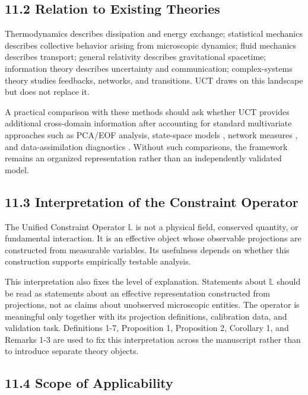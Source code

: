 \documentclass[aps,pre,reprint,superscriptaddress,nofootinbib]{revtex4-2}
\begin{document}
\subsection{11.2 Relation to Existing Theories}

Thermodynamics describes dissipation and energy exchange; statistical mechanics describes collective behavior arising from microscopic dynamics; fluid mechanics describes transport; general relativity describes gravitational spacetime; information theory describes uncertainty and communication; complex-systems theory studies feedbacks, networks, and transitions. UCT draws on this landscape but does not replace it.

A practical comparison with these methods should ask whether UCT provides additional cross-domain information after accounting for standard multivariate approaches such as PCA/EOF analysis, state-space models \cite{Kalman1960}, network measures \cite{Barabasi2016,Boccaletti2014Multilayer,Kivela2014Multilayer}, and data-assimilation diagnostics \cite{Kalnay2003Assimilation}. Without such comparisons, the framework remains an organized representation rather than an independently validated model.

\subsection{11.3 Interpretation of the Constraint Operator}

The Unified Constraint Operator \(\mathbb{L}\) is not a physical field, conserved quantity, or fundamental interaction. It is an effective object whose observable projections are constructed from measurable variables. Its usefulness depends on whether this construction supports empirically testable analysis.

This interpretation also fixes the level of explanation. Statements about \(\mathbb{L}\) should be read as statements about an effective representation constructed from projections, not as claims about unobserved microscopic entities. The operator is meaningful only together with its projection definitions, calibration data, and validation task. Definitions 1-7, Proposition 1, Proposition 2, Corollary 1, and Remarks 1-3 are used to fix this interpretation across the manuscript rather than to introduce separate theory objects.

\subsection{11.4 Scope of Applicability}
\end{document}
